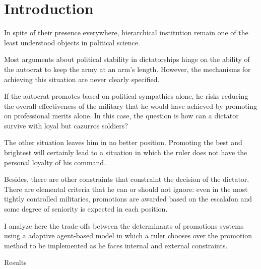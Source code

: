 \section{Introduction}

In spite of their presence everywhere, hierarchical institution remain one of
the least understood objects in political science. 

Most arguments about political stability in dictatorships hinge on the ability
of the autocrat to keep the army at an arm's length. However, the mechanisms for
achieving this situation are never clearly specified. 

If the autocrat promotes based on political sympathies alone, he risks reducing
the overall effectiveness of the military that he would have achieved by
promoting on professional merits alone. In this case, the question is how can a
dictator survive with loyal but cazurros soldiers?

The other situation leaves him in no better position. Promoting the best and
brightest will certainly lead to a situation in which the ruler does not have
the personal loyalty of his command.

Besides, there are other constraints that constraint the decision of the
dictator. There are elemental criteria that he can or should not ignore: even in
the most tightly controlled militaries, promotions are awarded based on the
escalafon and some degree of seniority is expected in each position.

I analyze here the trade-offs between the determinants of promotions systems
using a adaptive agent-based model in which a ruler chooses over the promotion
method to be implemented as he faces internal and external constraints. 

Results


